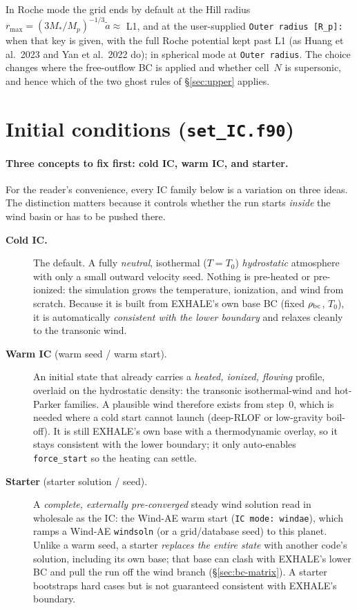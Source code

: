 \documentclass[english,a4paper]{my_memo}
\begin{document}
In Roche mode the grid ends by default at the Hill radius
$r_{\max} = (3 M_*/M_p)^{-1/3}\tilde a \approx$ L1, and at the
user-supplied \texttt{Outer radius [R\_p]:} when that key is given, with
the full Roche potential kept past L1 (as Huang et al.\ 2023 and Yan et
al.\ 2022 do); in spherical mode at \texttt{Outer radius}. The choice
changes where the free-outflow BC is applied and whether cell~$N$ is
supersonic, and hence which of the two ghost rules of \S\ref{sec:upper}
applies.

\section{Initial conditions (\texttt{set\_IC.f90})}
\label{sec:ic}

\paragraph{Three concepts to fix first: \textbf{cold IC}, \textbf{warm IC}, and
\textbf{starter}.} For the reader's convenience, every IC family below is a
variation on three ideas. The distinction matters because it controls whether
the run starts \emph{inside} the wind basin or has to be pushed there.
\begin{description}
\item[\textbf{Cold IC.}] The default. A fully \emph{neutral}, isothermal
  ($T = T_0$) \emph{hydrostatic} atmosphere with only a small outward velocity
  seed. Nothing is pre-heated or pre-ionized: the simulation grows the
  temperature, ionization, and wind from scratch. Because it is built from
  EXHALE's own base BC (fixed $\rho_{\rm bc}$, $T_0$), it is automatically
  \emph{consistent with the lower boundary} and relaxes cleanly to the
  transonic wind.
\item[\textbf{Warm IC} (warm seed / warm start).] An initial state that already
  carries a \emph{heated, ionized, flowing} profile, overlaid on the hydrostatic
  density: the transonic isothermal-wind and hot-Parker families. A plausible
  wind therefore exists from step~0, which is needed where a cold start cannot
  launch (deep-RLOF or low-gravity boil-off). It is still EXHALE's own base with
  a thermodynamic overlay, so it stays consistent with the lower boundary; it
  only auto-enables \texttt{force\_start} so the heating can settle.
\item[\textbf{Starter} (starter solution / seed).] A \emph{complete, externally
  pre-converged} steady wind solution read in wholesale as the IC: the
  Wind-AE warm start (\texttt{IC mode: windae}), which ramps a Wind-AE
  \texttt{windsoln} (or a grid/database seed) to this planet. Unlike a warm
  seed, a starter \emph{replaces the entire state} with another code's solution,
  including its own base; that base can clash with EXHALE's lower BC and pull the
  run off the wind branch (\S\ref{sec:bc-matrix}). A starter bootstraps hard
  cases but is not guaranteed consistent with EXHALE's boundary.
\end{description}
\end{document}
